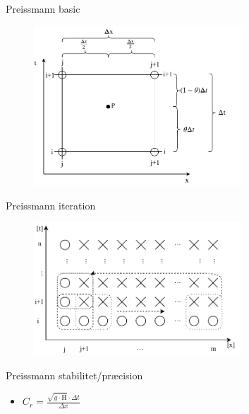 \begin{frame}{Preissmann basic}{}
\vfill\vfill\centering
		\begin{figure}[H]
			\centering
			\includegraphics[width=0.7\textwidth]{Sections/pictures/preissmann_scheme.pdf}
		\end{figure}
\vfill\vfill		
\end{frame}

\begin{frame}{Preissmann iteration}{}
\vfill\vfill\centering
		\begin{figure}[H]
			\centering
			\includegraphics[width=0.7\textwidth]{Sections/pictures/preissmann_scheme_iteration.pdf}
		\end{figure}
\vfill\vfill		
\end{frame}


\begin{frame}{Preissmann stabilitet/præcision}{}
\vfill\vfill\centering
\begin{itemize}
	\item $C_r =  \frac{\sqrt{g \cdot \overline{\text{H}}} \cdot \Delta t}{\Delta x}$
\end{itemize}
\vfill\vfill		
\end{frame}

